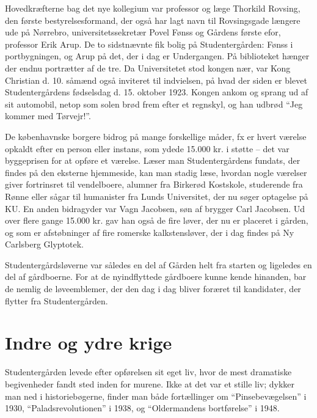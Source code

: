 \documentclass[11pt,article,twoside,openany,danish,extrafontsizes]{memoir} %
\begin{document}
Hovedkræfterne bag det nye kollegium var professor og læge Thorkild Rovsing, den første bestyrelsesformand, der også har lagt navn til Rovsingsgade længere ude på Nørrebro, universitetssekretær Povel Fønss og Gårdens første efor, professor Erik Arup. De to sidstnævnte fik bolig på Studentergården: Fønss i portbygningen, og Arup på det, der i dag er Undergangen. På biblioteket hænger der endnu portrætter af de tre. Da Universitetet stod kongen nær, var Kong Christian d. 10. såmænd også inviteret til indvielsen, på hvad der siden er blevet Studentergårdens fødselsdag d. 15. oktober 1923. Kongen ankom og sprang ud af sit automobil, netop som solen brød frem efter et regnskyl, og han udbrød \enquote{Jeg kommer med Tørvejr!}.

De københavnske borgere bidrog på mange forskellige måder, fx er hvert værelse opkaldt efter en person eller instans, som ydede 15.000 kr. i støtte -- det var byggeprisen for at opføre et værelse. Læser man Studentergårdens fundats, der findes på den eksterne hjemmeside, kan man stadig læse, hvordan nogle værelser giver fortrinsret til vendelboere, alumner fra Birkerød Kostskole, studerende fra Rønne eller sågar til humanister fra Lunds Universitet, der nu søger optagelse på KU. En anden bidragyder var Vagn Jacobsen, søn af brygger Carl Jacobsen. Ud over flere gange 15.000 kr. gav han også de fire løver, der nu er placeret i gården, og som er afstøbninger af fire romerske kalkstensløver, der i dag findes på Ny Carlsberg Glyptotek.

Studentergårdsløverne var således en del af Gården helt fra starten og ligeledes en del af gårdboerne. For at de nyindflyttede gårdboere kunne kende hinanden, bar de nemlig de løveemblemer, der den dag i dag bliver foræret til kandidater, der flytter fra Studentergården.



\section{Indre og ydre krige}
Studentergården levede efter opførelsen sit eget liv, hvor de mest dramatiske begivenheder fandt sted inden for murene. Ikke at det var et stille liv; dykker man ned i historiebøgerne, finder man både fortællinger om \enquote{Pinsebevægelsen} i 1930, \enquote{Paladsrevolutionen} i 1938, og \enquote{Oldermandens bortførelse} i 1948.
\end{document}
